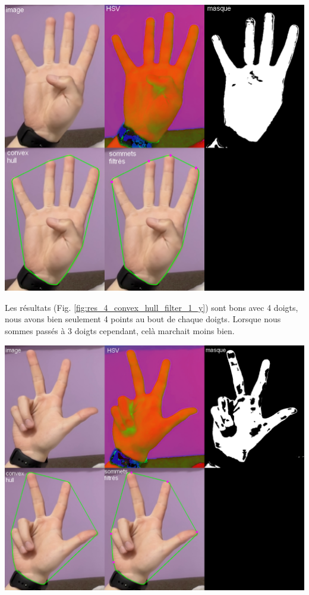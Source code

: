 \documentclass[11pt]{article}
\begin{document}
\begin{center}
    \includegraphics[width=\textwidth]{images/res_4_convex_hull_filter_1_y.png}
    \label{fig:res_4_convex_hull_filter_1_y}
\end{center}

Les résultats (Fig. \ref{fig:res_4_convex_hull_filter_1_y}) sont bons avec 4 doigts, nous avons bien seulement 4 points au bout de chaque doigts.
Lorsque nous sommes passés à 3 doigts cependant, celà marchait moins bien. \bigbreak

\begin{center}
    \includegraphics[width=\textwidth]{images/res_3_convex_hull_filter_1_y.png}
    \label{fig:res_3_convex_hull_filter_1_y}
\end{center}
\end{document}
